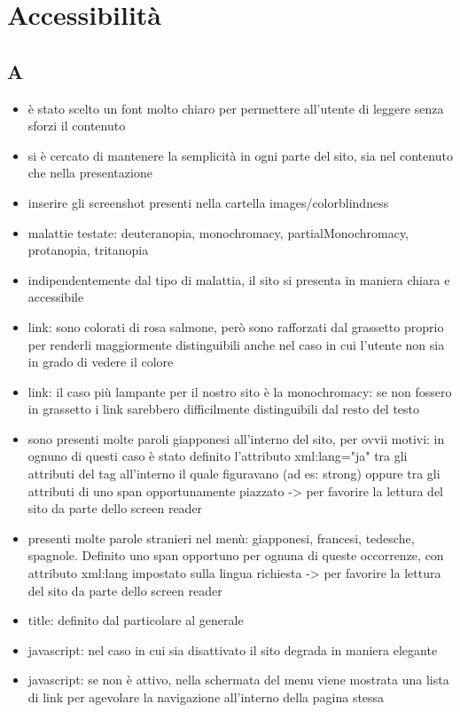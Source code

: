 \documentclass[../relazione.tex]{subfiles}
\begin{document}
\section{Accessibilità}
	\subsection{A}
	\begin{itemize}
		\item è stato scelto un font molto chiaro per permettere all'utente di leggere senza sforzi il contenuto
		\item si è cercato di mantenere la semplicità in ogni parte del sito, sia nel contenuto che nella presentazione
		\item inserire gli screenshot presenti nella cartella images/colorblindness
		\item malattie testate: deuteranopia, monochromacy, partialMonochromacy, protanopia, tritanopia
		\item indipendentemente dal tipo di malattia, il sito si presenta in maniera chiara e accessibile
		\item link: sono colorati di rosa salmone, però sono rafforzati dal grassetto proprio per renderli maggiormente distinguibili anche nel caso in cui l'utente non sia in grado di vedere il colore
		\item link: il caso più lampante per il nostro sito è la monochromacy: se non fossero in grassetto i link sarebbero difficilmente distinguibili dal resto del testo
		\item sono presenti molte paroli giapponesi all'interno del sito, per ovvii motivi: in ognuno di questi caso è stato definito l'attributo xml:lang="ja" tra gli attributi del tag all'interno il quale figuravano (ad es: strong) oppure tra gli attributi di uno span opportunamente piazzato -> per favorire la lettura del sito da parte dello screen reader
		\item presenti molte parole stranieri nel menù: giapponesi, francesi, tedesche, spagnole. Definito uno span opportuno per ognuna di queste occorrenze, con attributo xml:lang impostato sulla lingua richiesta -> per favorire la lettura del sito da parte dello screen reader
		\item title: definito dal particolare al generale
		\item javascript: nel caso in cui sia disattivato il sito degrada in maniera elegante
		\item javascript: se non è attivo, nella schermata del menu viene mostrata una lista di link per agevolare la navigazione all'interno della pagina stessa

\end{itemize}
\end{document}
